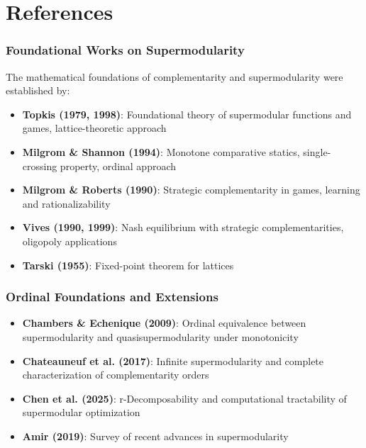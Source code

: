 \section{References}
\label{sec:B-references}


\subsubsection{Foundational Works on Supermodularity}

The mathematical foundations of complementarity and supermodularity were 
established by:

\begin{itemize}
    \item \textbf{Topkis (1979, 1998)}: Foundational theory of supermodular 
    functions and games, lattice-theoretic approach
    \item \textbf{Milgrom \& Shannon (1994)}: Monotone comparative statics, 
    single-crossing property, ordinal approach
    \item \textbf{Milgrom \& Roberts (1990)}: Strategic complementarity in games, 
    learning and rationalizability
    \item \textbf{Vives (1990, 1999)}: Nash equilibrium with strategic 
    complementarities, oligopoly applications
    \item \textbf{Tarski (1955)}: Fixed-point theorem for lattices
\end{itemize}

\subsubsection{Ordinal Foundations and Extensions}

\begin{itemize}
    \item \textbf{Chambers \& Echenique (2009)}: Ordinal equivalence between 
    supermodularity and quasisupermodularity under monotonicity
    \item \textbf{Chateauneuf et al. (2017)}: Infinite supermodularity and 
    complete characterization of complementarity orders
    \item \textbf{Chen et al. (2025)}: r-Decomposability and computational 
    tractability of supermodular optimization
    \item \textbf{Amir (2019)}: Survey of recent advances in supermodularity
\end{itemize}

